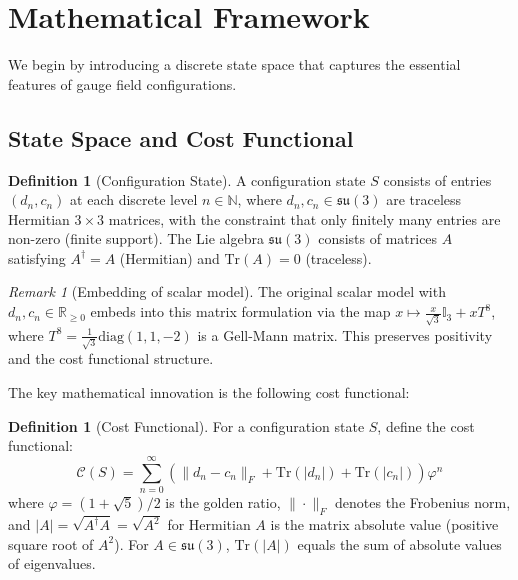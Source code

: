 \documentclass[11pt]{article}
\numberwithin{equation}{section}
\theoremstyle{definition}
\newtheorem{definition}[theorem]{Definition}
\theoremstyle{remark}
\newtheorem{remark}[theorem]{Remark}
\begin{document}
\section{Mathematical Framework}
\label{sec:framework}

We begin by introducing a discrete state space that captures the essential features of gauge field configurations.

\subsection{State Space and Cost Functional}

\begin{definition}[Configuration State]
A configuration state $S$ consists of entries $(d_n, c_n)$ at each discrete level $n \in \mathbb{N}$, where $d_n, c_n \in \mathfrak{su}(3)$ are traceless Hermitian $3 \times 3$ matrices, with the constraint that only finitely many entries are non-zero (finite support). The Lie algebra $\mathfrak{su}(3)$ consists of matrices $A$ satisfying $A^\dagger = A$ (Hermitian) and $\text{Tr}(A) = 0$ (traceless).
\end{definition}

\begin{remark}[Embedding of scalar model]
The original scalar model with $d_n, c_n \in \mathbb{R}_{\geq 0}$ embeds into this matrix formulation via the map $x \mapsto \frac{x}{\sqrt{3}} \mathbb{I}_3 + x T^8$, where $T^8 = \frac{1}{\sqrt{3}}\text{diag}(1,1,-2)$ is a Gell-Mann matrix. This preserves positivity and the cost functional structure.
\end{remark}

The key mathematical innovation is the following cost functional:

\begin{definition}[Cost Functional]
For a configuration state $S$, define the cost functional:
\begin{equation}
\mathcal{C}(S) = \sum_{n=0}^{\infty} \left(\|d_n - c_n\|_F + \text{Tr}(|d_n|) + \text{Tr}(|c_n|)\right) \varphi^n
\end{equation}
where $\varphi = (1+\sqrt{5})/2$ is the golden ratio, $\|\cdot\|_F$ denotes the Frobenius norm, and $|A| = \sqrt{A^\dagger A} = \sqrt{A^2}$ for Hermitian $A$ is the matrix absolute value (positive square root of $A^2$). For $A \in \mathfrak{su}(3)$, $\text{Tr}(|A|)$ equals the sum of absolute values of eigenvalues.
\end{definition}
\end{document}
